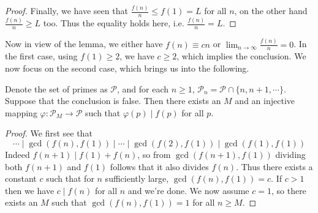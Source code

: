 \documentclass[11pt,a4paper]{article}
\begin{document}
\begin{enumerate}
\begin{proof}
        Finally, we have seen that $\frac{f(n)}{n}\le f(1) = L$ for all $n$, on the other hand $\frac{f(n)}{n}\ge L$ too. 
        Thus the equality holds here, i.e. $\frac{f(n)}{n}=L$. 
    \end{proof}
    
    Now in view of the lemma, we either have $f(n) \equiv cn$ or $\lim_{n\to\infty} \frac{f(n)}{n} = 0$. 
    In the first case, using $f(1)\ge 2$, we have $c\ge 2$, 
    which implies the conclusion. 
    We now focus on the second case, 
    which brings us into the following. 
    
    \begin{lemma}\label{lmm:n6primes}
    	  Denote the set of primes as $\mathcal{P}$, and for each $n\ge 1$, $\mathcal{P}_n=\mathcal{P}\cap \{n, n + 1, \cdots \}$. 
    	  Suppose that the conclusion is false. 
    	  Then there exists an $M$ and an injective mapping $\varphi:\mathcal{P}_M\to \mathcal{P}$ such that 
    	  $\varphi(p) \mid f(p)$ for all $p$. 
    \end{lemma}
    
    \begin{proof}
    	  We first see that 
    	  \begin{equation}
    	  	  \cdots \mid \gcd(f(n), f(1)) \mid \cdots \mid \gcd(f(2), f(1))\mid \gcd(f(1), f(1))
    	  \end{equation}
    	  Indeed $f(n+1)\mid f(1) + f(n)$, so from $\gcd(f(n + 1), f(1))$ dividing both $f(n+1)$ and $f(1)$ follows that 
    	  it also divides $f(n)$. 
    	  Thus there exists a constant $c$ such that for $n$ sufficiently large, $\gcd(f(n), f(1))=c$. 
    	  If $c > 1$ then we have $c\mid f(n)$ for all $n$ and we're done. 
    	  We now assume $c = 1$, so there exists an $M$ such that $\gcd(f(n), f(1))=1$ for all $n\ge M$. 
    	  

\end{proof}
\end{enumerate}
\end{document}
